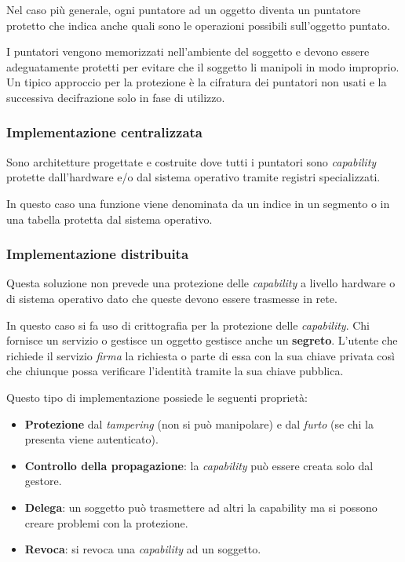 Nel caso più generale, ogni puntatore ad un oggetto diventa un puntatore protetto che indica anche quali sono le
operazioni possibili sull'oggetto puntato.

I puntatori vengono memorizzati nell'ambiente del soggetto e devono essere adeguatamente protetti per evitare che il
soggetto li manipoli in modo improprio. Un tipico approccio per la protezione è la cifratura dei puntatori non usati
e la successiva decifrazione solo in fase di utilizzo.

\subsubsection{Implementazione centralizzata}
Sono architetture progettate e costruite dove tutti i puntatori sono \emph{capability} protette dall'hardware e/o dal
sistema operativo tramite registri specializzati.

In questo caso una funzione viene denominata da un indice in un segmento o in una tabella protetta dal sistema
operativo.

\subsubsection{Implementazione distribuita}
Questa soluzione non prevede una protezione delle \emph{capability} a livello hardware o di sistema operativo dato che
queste devono essere trasmesse in rete.

In questo caso si fa uso di crittografia per la protezione delle \emph{capability}. Chi fornisce un servizio o gestisce
un oggetto gestisce anche un \textbf{segreto}. L'utente che richiede il servizio \emph{firma} la richiesta o parte di
essa con la sua chiave privata così che chiunque possa verificare l'identità tramite la sua chiave pubblica.

Questo tipo di implementazione possiede le seguenti proprietà:
\begin{itemize}
	\item \textbf{Protezione} dal \emph{tampering} (non si può manipolare) e dal \emph{furto} (se chi la presenta
	      viene autenticato).
	\item \textbf{Controllo della propagazione}: la \emph{capability} può essere creata solo dal gestore.
	\item \textbf{Delega}: un soggetto può trasmettere ad altri la capability ma si possono creare problemi con la
	      protezione.
	\item \textbf{Revoca}: si revoca una \emph{capability} ad un soggetto.
\end{itemize}

